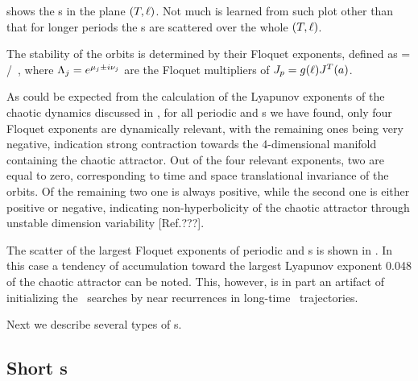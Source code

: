  shows the \rpo s in the plane
$(\period{},\shift)$.  Not much is learned from such plot other than
that for longer periods the \rpo s are scattered over the
whole $(\period{},\shift)$.

The stability of the orbits is determined by their Floquet exponents,
defined as
\beq
{} = \eigRe[j]/\period{} \,,
where $\ExpaEig_j = e^{\eigRe[j] \pm i \eigIm[j]}$ are the
Floquet multipliers of $\jMps_p = g(\shift)J^T(a)$.


As could be expected from the calculation of the Lyapunov
exponents of the chaotic dynamics discussed in ,
for all periodic and \rpo s we have found, only four Floquet
exponents are dynamically relevant, with the remaining ones being
very negative, indication strong contraction towards the 4-dimensional
manifold containing the chaotic attractor.  Out of the four
relevant exponents, two are equal to zero, corresponding to
time and space translational invariance of the orbits.  Of the
remaining two one is always positive, while the second one is either
positive or negative, indicating non-hyperbolicity of the
chaotic attractor through unstable dimension variability
[Ref.???].

The scatter of the %
largest Floquet exponents
of periodic and \rpo s is shown in .
In this case a tendency of accumulation toward the largest
Lyapunov exponent 0.048 of the chaotic attractor
can be noted.  This, however, is in part an artifact of initializing
the \rpo\ searches by near recurrences in
long-time \statesp\ trajectories.

Next we describe several types of \rpo s.

\subsection{Short \rpo s}

